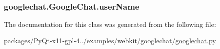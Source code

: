 \subsubsection[{user\+Name}]{\setlength{\rightskip}{0pt plus 5cm}googlechat.\+Google\+Chat.\+user\+Name}\label{classgooglechat_1_1GoogleChat_aa0016cd1ebc38c6937373396d36c77dc}


The documentation for this class was generated from the following file\+:\begin{DoxyCompactItemize}
\item 
packages/\+Py\+Qt-\/x11-\/gpl-\/4../examples/webkit/googlechat/\hyperlink{googlechat_8py}{googlechat.\+py}\end{DoxyCompactItemize}
